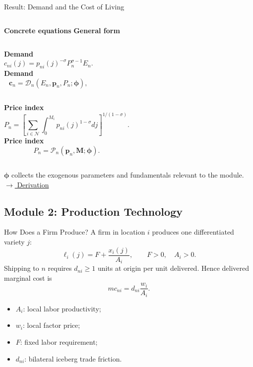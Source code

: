 \documentclass[aspectratio=169,11pt]{beamer}
\newcommand{\B}[1]{\textcolor{blue1}{\textbf{#1}}}
\newcommand{\derivlink}[1]{%
  \hyperlink{#1}{\textcolor{blue1}{\footnotesize
  \(\longrightarrow\) Derivation}}}
\begin{document}
\begin{frame}[t,label=mainPreferences]{Result: Demand and the Cost of Living}
  \small
  \setlength{\abovedisplayskip}{3pt}
  \setlength{\belowdisplayskip}{3pt}

  \begin{columns}[T,onlytextwidth]
      \B{Concrete equations}
      \B{General form}
  \end{columns}

  \smallskip
  \begin{columns}[T,onlytextwidth]
      \B{Demand}
      \[
        c_{ni}(j)
        =
        p_{ni}(j)^{-\sigma}P_n^{\sigma-1}E_n.
      \]
      \B{Demand}
      \[
        \mathbf c_n
        =\mathcal D_n(E_n,\mathbf p_n,P_n;\boldsymbol\phi),
      \]
  \end{columns}

  \smallskip
  \begin{columns}[T,onlytextwidth]
      \B{Price index}
      \[
        P_n
        =
        \left[
          \sum_{i\in\mathcal N}\int_0^{M_i}
            p_{ni}(j)^{1-\sigma}dj
         \right]^{1/(1-\sigma)}.
      \]
      \B{Price index}
      \[
        P_n
        =\mathcal P_n(\mathbf p_n,\mathbf M;\boldsymbol\phi).
      \]
  \end{columns}
  \smallskip
  {\footnotesize
  \(\boldsymbol\phi\) collects the exogenous parameters and fundamentals
  relevant to the module.}
  \smallskip
  \hfill\derivlink{appCES}
\end{frame}

\subsection{Module 2: Production Technology}

\begin{frame}{How Does a Firm Produce?}
  A firm in location \(i\) produces one differentiated variety \(j\):
  \[
    \ell_i(j)=F+\frac{x_i(j)}{A_i},
    \qquad F>0,\quad A_i>0.
  \]
  Shipping to \(n\) requires \(d_{ni}\geq1\) units at origin per unit delivered.
  Hence delivered marginal cost is
  \[
    mc_{ni}=d_{ni}\frac{w_i}{A_i}.
  \]
  \begin{itemize}
    \item \(A_i\): local labor productivity;
    \item \(w_i\): local factor price;
    \item \(F\): fixed labor requirement;
    \item \(d_{ni}\): bilateral iceberg trade friction.
  \end{itemize}
\end{frame}
\end{document}
